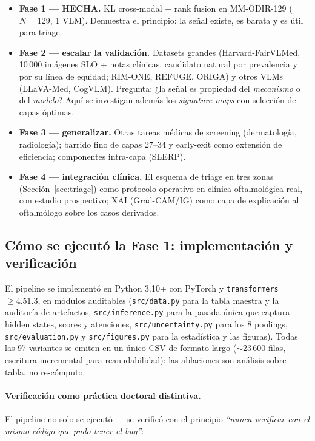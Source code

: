 \documentclass[12pt,a4paper]{article}
\begin{document}
\begin{itemize}[leftmargin=1.4em]
    \item \textbf{Fase 1 --- HECHA.} KL cross-modal + rank fusion en
    MM-ODIR-129 ($N = 129$, 1 VLM). Demuestra el principio: la señal
    existe, es barata y es útil para triage.
    \item \textbf{Fase 2 --- escalar la validación.} Datasets grandes
    (Harvard-FairVLMed, 10\,000 imágenes SLO + notas clínicas, candidato
    natural por prevalencia y por su línea de equidad; RIM-ONE, REFUGE,
    ORIGA) y otros VLMs (LLaVA-Med, CogVLM). Pregunta: ¿la señal es
    propiedad del \emph{mecanismo} o del \emph{modelo}? Aquí se investigan
    además los \emph{signature maps} con selección de capas óptimas.
    \item \textbf{Fase 3 --- generalizar.} Otras tareas médicas de
    screening (dermatología, radiología); barrido fino de capas 27--34 y
    early-exit como extensión de eficiencia; componentes intra-capa
    (SLERP).
    \item \textbf{Fase 4 --- integración clínica.} El esquema de triage en
    tres zonas (Sección~\ref{sec:triage}) como protocolo operativo en
    clínica oftalmológica real, con estudio prospectivo; XAI
    (Grad-CAM/IG) como capa de explicación al oftalmólogo sobre los casos
    derivados.
\end{itemize}

\subsection{Cómo se ejecutó la Fase 1: implementación y verificación}
\label{sec:implementacion}

El pipeline se implementó en Python 3.10+ con PyTorch y
\texttt{transformers} $\geq 4.51.3$, en módulos auditables
(\texttt{src/data.py} para la tabla maestra y la auditoría de artefactos,
\texttt{src/inference.py} para la pasada única que captura hidden states,
scores y atenciones, \texttt{src/uncertainty.py} para los 8 poolings,
\texttt{src/evaluation.py} y \texttt{src/figures.py} para la estadística y
las figuras). Todas las 97 variantes se emiten en un único CSV de formato
largo ($\sim$23\,600 filas, escritura incremental para reanudabilidad):
las ablaciones son análisis sobre tabla, no re-cómputo.

\paragraph{Verificación como práctica doctoral distintiva.} El pipeline no
solo se ejecutó --- se verificó con el principio \emph{``nunca verificar
con el mismo código que pudo tener el bug''}:
\end{document}
